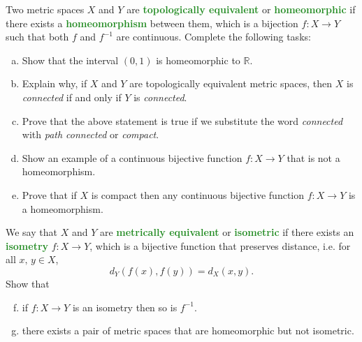 \documentclass[11pt]{scrartcl}
\providecommand{\RR}{\mathbb R}
\providecommand{\ii}{\item}
\providecommand{\inv}{^{-1}}
\providecommand{\vocab}[1]{{\textbf{\textcolor{ForestGreen}{#1}}}}
\begin{document}
\begin{problem}
	Two metric spaces $X$ and $Y$ are \vocab{topologically equivalent}
	or \vocab{homeomorphic} if there exists a \vocab{homeomorphism}
	between them, which is a bijection $f\colon X\to Y$ such that
	both $f$ and $f\inv$ are continuous. Complete the following tasks:
	\begin{enumerate}[(a)]
		\ii Show that the interval $(0, 1)$ is homeomorphic to $\RR$.
		\ii Explain why, if $X$ and $Y$ are topologically equivalent
		metric spaces, then $X$ is \emph{connected} if and only if
		$Y$ is \emph{connected}.
		\ii Prove that the above statement is true
		if we substitute the word \emph{connected} with
		\emph{path connected} or \emph{compact}.
		\ii Show an example of a continuous bijective function
		$f\colon X\to Y$ that is not a homeomorphism.
		\ii Prove that if $X$ is compact then any
		continuous bijective function $f\colon X\to Y$ is a homeomorphism.
	\end{enumerate}
	
	We say that $X$ and $Y$ are \vocab{metrically equivalent}
	or \vocab{isometric} if there exists an \vocab{isometry}
	$f\colon X\to Y$, which is a bijective function that preserves distance,
	i.e. for all $x,\,y\in X$,
	\[d_Y(f(x), f(y)) = d_X(x, y).\]
	Show that
	\begin{enumerate}[(a)]
		\setcounter{enumi}{5}
		\ii if $f\colon X\to Y$ is an isometry then so is $f\inv$.
		\ii there exists a pair of metric spaces
		that are homeomorphic but not isometric.
	\end{enumerate}
\end{problem}
\end{document}
